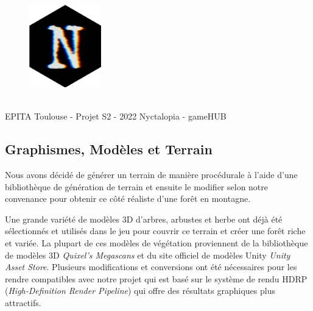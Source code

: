 \begin{figure}[H]
\centering
\begin{minipage}{.5\textwidth}
  \centering
  \centerline{\includegraphics[width=0.5\linewidth]{img/logos/logojeu.png}}
  \label{fig:logonyctalopia}
\end{minipage}%
\end{figure}

\vfill
\noindent\makebox[\linewidth]{\rule{.8\paperwidth}{.6pt}}\\[0.2cm]
EPITA Toulouse - Projet S2 - 2022 \hfill Nyctalopia - gameHUB
\noindent\makebox[\linewidth]{\rule{.8\paperwidth}{.6pt}}

\subsection{Graphismes, Modèles et Terrain}
\setlength{\parindent}{5ex}
Nous avons décidé de générer un terrain de manière procédurale à l'aide d'une bibliothèque de génération de terrain et ensuite le modifier selon notre convenance pour obtenir ce côté réaliste d'une forêt en montagne.

Une grande variété de modèles 3D d’arbres, arbustes et herbe ont déjà été sélectionnés et utilisés dans le jeu pour couvrir ce terrain et créer une forêt riche et variée. La plupart de ces modèles de végétation proviennent de la bibliothèque de modèles 3D \emph{Quixel’s Megascans} et du site officiel de modèles Unity \emph{Unity Asset Store}. Plusieurs modifications et conversions ont été nécessaires pour les rendre compatibles avec notre projet qui est basé sur le système de rendu HDRP (\emph{High-Definition Render Pipeline}) qui offre des résultats graphiques plus attractifs.
\newline

